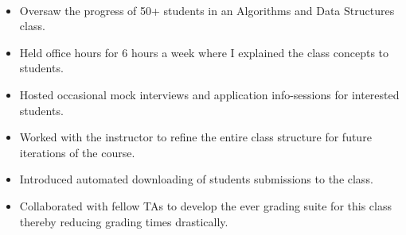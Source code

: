 \\
\begin{itemize}
    \item Oversaw the progress of 50+ students in an Algorithms and Data Structures class.
    \item Held office hours for 6 hours a week where I explained the class concepts to students.
    \item Hosted occasional mock interviews and application info-sessions for interested students.
    \item Worked with the instructor to refine the entire class structure for future iterations of the course.
    \item Introduced automated downloading of students\textquotesingle{} submissions to the class.
    \item Collaborated with fellow TAs to develop the  ever grading suite for this class thereby reducing grading times drastically.
\end{itemize}
